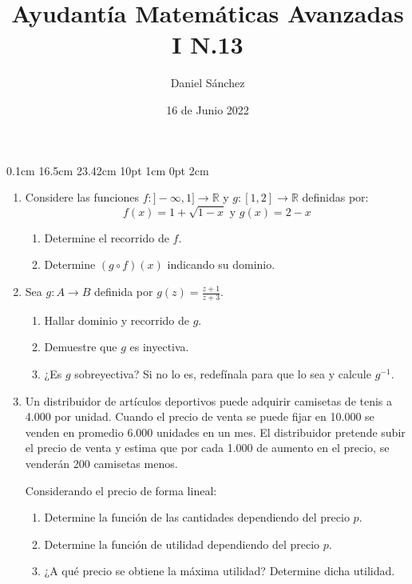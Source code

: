 \documentclass[12pt]{article}
\newcommand{\D}{\displaystyle}
\begin{document}
\setmargins{2.5cm}
{0.1cm}
{16.5cm}
{23.42cm}
{10pt}
{1cm}
{0pt}
{2cm}

\title{Ayudant\'ia Matem\'aticas Avanzadas I N.13}
\date{16 de Junio 2022}
\author{Daniel S\'anchez}
\maketitle

\begin{enumerate}
	\item Considere las funciones $f: ]-\infty,1] \rightarrow \mathbb{R}$ y $g: [1,2] \rightarrow \mathbb{R}$ definidas por:
	      $$f(x) = 1 + \sqrt{1-x} \mbox{ y } g(x) = 2-x$$
	      \begin{enumerate}
		      \item Determine el recorrido de $f$.
		      \item Determine $(g \circ f)(x)$ indicando su dominio.
	      \end{enumerate}
	\item Sea $g: A \rightarrow B$ definida por $\D g(z) = \frac{z+1}{z+3}$.
	      \begin{enumerate}
		      \item Hallar dominio y recorrido de $g$.
		      \item Demuestre que $g$ es inyectiva.
		      \item ¿Es $g$ sobreyectiva? Si no lo es, redef\'inala para que lo sea y calcule $g^{-1}$.
	      \end{enumerate}
	\item Un distribuidor de art\'iculos deportivos puede adquirir camisetas de tenis a 4.000 por unidad.
	      Cuando el precio de venta se puede fijar en 10.000 se venden en promedio 6.000 unidades en un mes. El
	      distribuidor pretende subir el precio de venta y estima que por cada 1.000 de aumento en el precio, se
	      vender\'an 200 camisetas menos. 
	      
	      Considerando el precio de forma lineal:
	      \begin{enumerate}
		      \item Determine la funci\'on de las cantidades dependiendo del precio $p$.
		      \item Determine la funci\'on de utilidad dependiendo del precio $p$.
		      \item ¿A qu\'e precio se obtiene la m\'axima utilidad? Determine dicha utilidad.
	      \end{enumerate}
\end{enumerate}
\end{document}
